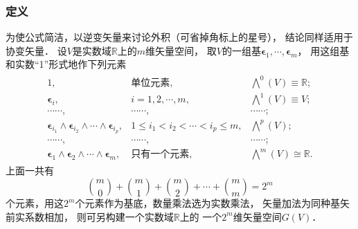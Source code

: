 \subsubsection{定义}\label{chmla:sec_def-exterior-product}
为使公式简洁，以逆变矢量来讨论外积（可省掉角标上的星号），
结论同样适用于协变矢量．
设$V$是实数域$\mathbb{R}$上的$m$维矢量空间，
取$V$的一组基$\boldsymbol{\epsilon}_1,\cdots,\boldsymbol{\epsilon}_m$，
用这组基和实数“1”形式地作下列元素
\begin{equation}\label{chmla:eqn_grassman-bases}
\begin{aligned}
\begin{array}{lll}
    1, & \text{单位元素}, &\bigwedge^0(V)\equiv \mathbb{R}; \\
    \boldsymbol{\epsilon}_i, & i=1,2,\cdots,m , &\bigwedge^1(V) \equiv V; \\
    \cdots\cdots, & \cdots\cdots , & \cdots\cdots; \\
    \boldsymbol{\epsilon}_{i_1} \wedge \boldsymbol{\epsilon}_{i_2} \wedge \cdots \wedge \boldsymbol{\epsilon}_{i_p},
      & 1\leqslant {i_1} < {i_2} < \cdots <i_p  \leqslant m , &\bigwedge^p(V); \\
    \cdots\cdots, & \cdots\cdots , & \cdots\cdots; \\
    \boldsymbol{\epsilon}_{1} \wedge \boldsymbol{\epsilon}_{2} \wedge \cdots \wedge \boldsymbol{\epsilon}_{m},
      & \text{只有一个元素}, &\bigwedge^m(V) \cong \mathbb{R}.
\end{array}
\end{aligned}
\end{equation}
上面一共有
\begin{equation}
    \binom{m}{0} + \binom{m}{1} +\binom{m}{2} + \cdots + \binom{m}{m} = 2^m  
\end{equation}
个元素，用这$2^m$个元素作为基底，数量乘法选为实数乘法，
矢量加法为同种基矢前实系数相加，
则可另构建一个实数域$\mathbb{R}$上的
一个$2^m$维矢量空间$G(V)$．

